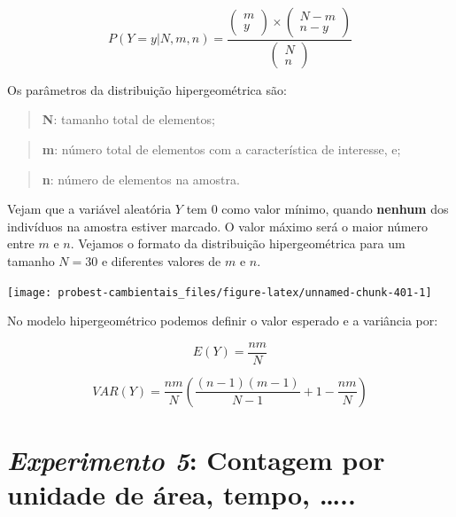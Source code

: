 \documentclass[
]{book}
\begin{document}
\[P(Y=y|N,m,n) = \frac{\left (\begin{array}{c} m \\ y \end{array}\right) \times \left (\begin{array}{c} N-m \\ n-y \end{array}\right)}{\left (\begin{array}{c} N \\ n \end{array}\right)}\]

Os parâmetros da distribuição hipergeométrica são:

\begin{quote}
\textbf{N}: tamanho total de elementos;
\end{quote}

\begin{quote}
\textbf{m}: número total de elementos com a característica de interesse, e;
\end{quote}

\begin{quote}
\textbf{n}: número de elementos na amostra.
\end{quote}

Vejam que a variável aleatória \(Y\) tem \(0\) como valor mínimo, quando \textbf{nenhum} dos indivíduos na amostra estiver marcado. O valor máximo será o maior número entre \(m\) e \(n\). Vejamos o formato da distribuição hipergeométrica para um tamanho \(N = 30\) e diferentes valores de \(m\) e \(n\).

\begin{center}\texttt{[image: probest-cambientais\_files/figure-latex/unnamed-chunk-401-1]} \end{center}

No modelo hipergeométrico podemos definir o valor esperado e a variância por:

\[E(Y) = \frac{n m}{N}\]

\[VAR(Y) = \frac{n m}{N}(\frac{(n-1)(m-1)}{N-1}+1-\frac{n m}{N})\]

\hypertarget{experimento-5-contagem-por-unidade-de-uxe1rea-tempo-..}{%
\section{\texorpdfstring{\emph{Experimento 5}: Contagem por unidade de área, tempo, \ldots..}{Experimento 5: Contagem por unidade de área, tempo, \ldots..}}\label{experimento-5-contagem-por-unidade-de-uxe1rea-tempo-..}}
\end{document}
